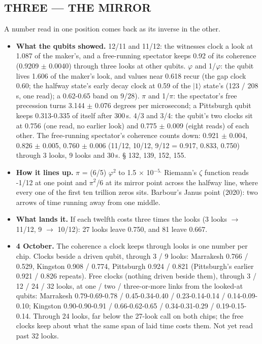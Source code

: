 \documentclass[11pt]{article}
\begin{document}
\subsection{THREE --- THE MIRROR}
A number read in one position comes back as its inverse in the other.

\begin{itemize}
\item \textbf{What the qubits showed.} 12/11 and 11/12: the witnesses clock a look at 1.087 of the maker's, and a free-running spectator keeps 0.92 of its coherence (0.9209 \(\pm\) 0.0040) through three looks at other qubits. \(\varphi\) and 1/\(\varphi\): the qubit lives 1.606 of the maker's look, and values near 0.618 recur (the gap clock 0.60; the halfway state's early decay clock at 0.59 of the \(|1\rangle\) state's (123 / 208\,\textmu s, one read); a 0.62-0.65 band on 9/28). \(\pi\) and 1/\(\pi\): the spectator's free precession turns 3.144 \(\pm\) 0.076 degrees per microsecond; a Pittsburgh qubit keeps 0.313-0.335 of itself after 300\,\textmu s. 4/3 and 3/4: the qubit's two clocks sit at 0.756 (one read, no earlier look) and 0.775 \(\pm\) 0.009 (eight reads) of each other. The free-running spectator's coherence counts down: 0.921 \(\pm\) 0.004, 0.826 \(\pm\) 0.005, 0.760 \(\pm\) 0.006 (11/12, 10/12, 9/12 = 0.917, 0.833, 0.750) through 3 looks, 9 looks and 30\,\textmu s. \S{} 132, 139, 152, 155.
\item \textbf{How it lines up.} \(\pi\) = (6/5) \(\varphi\)\(^{2}\) to 1.5 \(\times\) 10\(^{-5.}\) Riemann's \(\zeta\) function reads -1/12 at one point and \(\pi\)\(^{2}\)/6 at its mirror point across the halfway line, where every one of the first ten trillion zeros sits. Barbour's Janus point (2020): two arrows of time running away from one middle.
\item \textbf{What lands it.} If each twelfth costs three times the looks (3 looks \(\to\) 11/12, 9 \(\to\) 10/12): 27 looks leave 0.750, and 81 leave 0.667.
\item \textbf{4 October.} The coherence a clock keeps through looks is one number per chip. Clocks beside a driven qubit, through 3 / 9 looks: Marrakesh 0.766 / 0.529, Kingston 0.908 / 0.774, Pittsburgh 0.924 / 0.821 (Pittsburgh's earlier 0.921 / 0.826 repeats). Free clocks (nothing driven beside them), through 3 / 12 / 24 / 32 looks, at one / two / three-or-more links from the looked-at qubits: Marrakesh 0.79-0.69-0.78 / 0.45-0.34-0.40 / 0.23-0.14-0.14 / 0.14-0.09-0.10; Kingston 0.90-0.90-0.91 / 0.66-0.62-0.65 / 0.34-0.31-0.29 / 0.19-0.15-0.14. Through 24 looks, far below the 27-look call on both chips; the free clocks keep about what the same span of laid time costs them. Not yet read past 32 looks.
\end{itemize}
\end{document}
